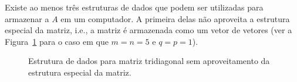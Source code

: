 \documentclass[12pt,a4paper]{article}
\begin{document}
Existe ao menos tr\^{e}s estruturas de dados que podem ser utilizadas para armazenar a $A$ em um computador. A primeira delas n\~{a}o aproveita a estrutura especial da matriz, i.e., a matriz \'{e} armazenada como um vetor de vetores (ver a Figura~\ref{fig:est_dados_matriz} para o caso em que $m = n = 5$ e $q = p = 1$).
\begin{figure}[!htb]
    \centering
    \caption{Estrutura de dados para matriz tridiagonal sem aproveitamento da estrutura especial da matriz.}
    \label{fig:est_dados_matriz}
\end{figure}
\end{document}

